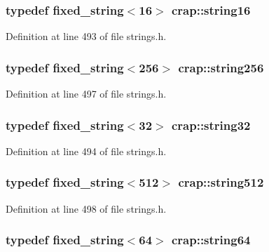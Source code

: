 \subsubsection[{string16}]{\setlength{\rightskip}{0pt plus 5cm}typedef {\bf fixed\+\_\+string}$<$16$>$ {\bf crap\+::string16}}\label{namespacecrap_a6cff91a13d8be23072b3a0754c947caa}


Definition at line 493 of file strings.\+h.

\hypertarget{namespacecrap_af674ac1cc38a09c563c68dfc3b15e554}{}
\subsubsection[{string256}]{\setlength{\rightskip}{0pt plus 5cm}typedef {\bf fixed\+\_\+string}$<$256$>$ {\bf crap\+::string256}}\label{namespacecrap_af674ac1cc38a09c563c68dfc3b15e554}


Definition at line 497 of file strings.\+h.

\hypertarget{namespacecrap_aed2599e591e7287057648c41883194c6}{}
\subsubsection[{string32}]{\setlength{\rightskip}{0pt plus 5cm}typedef {\bf fixed\+\_\+string}$<$32$>$ {\bf crap\+::string32}}\label{namespacecrap_aed2599e591e7287057648c41883194c6}


Definition at line 494 of file strings.\+h.

\hypertarget{namespacecrap_a52392ad28972b8b96725b2f7928d38fa}{}
\subsubsection[{string512}]{\setlength{\rightskip}{0pt plus 5cm}typedef {\bf fixed\+\_\+string}$<$512$>$ {\bf crap\+::string512}}\label{namespacecrap_a52392ad28972b8b96725b2f7928d38fa}


Definition at line 498 of file strings.\+h.

\hypertarget{namespacecrap_a2b8a7358804e1a9c3c32f12d8cdcfdf8}{}
\subsubsection[{string64}]{\setlength{\rightskip}{0pt plus 5cm}typedef {\bf fixed\+\_\+string}$<$64$>$ {\bf crap\+::string64}}\label{namespacecrap_a2b8a7358804e1a9c3c32f12d8cdcfdf8}



